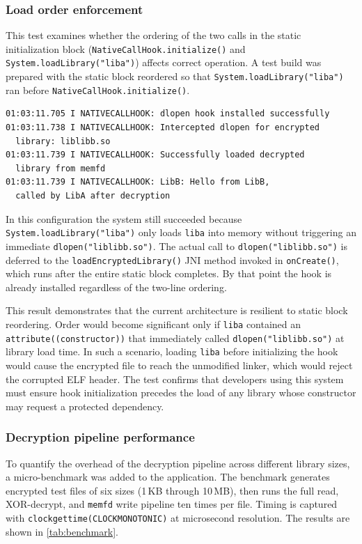 \documentclass[11pt,a4paper]{report}
\renewcommand\_{{\textunderscore\allowbreak}}
\begin{document}
\subsubsection{Load order enforcement}

This test examines whether the ordering of the two calls in the static initialization block (\texttt{NativeCall\allowbreak Hook.initialize()} and \texttt{System.loadLibrary("liba")}) affects correct operation. A test build was prepared with the static block reordered so that \texttt{System.\allowbreak loadLibrary("liba")} ran before \texttt{NativeCallHook.\allowbreak initialize()}.

\begin{verbatim}
01:03:11.705 I NATIVECALLHOOK: dlopen hook installed successfully
01:03:11.738 I NATIVECALLHOOK: Intercepted dlopen for encrypted
  library: liblibb.so
01:03:11.739 I NATIVECALLHOOK: Successfully loaded decrypted
  library from memfd
01:03:11.739 I NATIVECALLHOOK: LibB: Hello from LibB,
  called by LibA after decryption
\end{verbatim}

In this configuration the system still succeeded because \texttt{System.loadLibrary("liba")} only loads \texttt{liba} into memory without triggering an immediate \texttt{dlopen("liblibb.so")}. The actual call to \texttt{dlopen("liblibb.so")} is deferred to the \texttt{loadEncryptedLibrary()} JNI method invoked in \texttt{onCreate()}, which runs after the entire static block completes. By that point the hook is already installed regardless of the two-line ordering.

This result demonstrates that the current architecture is resilient to static block reordering. Order would become significant only if \texttt{liba} contained an \texttt{\_\_attribute\_\_((constructor))} that immediately called \texttt{dlopen("liblibb.so")} at library load time. In such a scenario, loading \texttt{liba} before initializing the hook would cause the encrypted file to reach the unmodified linker, which would reject the corrupted ELF header. The test confirms that developers using this system must ensure hook initialization precedes the load of any library whose constructor may request a protected dependency.

\subsubsection{Decryption pipeline performance}

To quantify the overhead of the decryption pipeline across different library sizes, a micro-benchmark was added to the application. The benchmark generates encrypted test files of six sizes (1\,KB through 10\,MB), then runs the full read, XOR-decrypt, and \texttt{memfd} write pipeline ten times per file. Timing is captured with \texttt{clock\_gettime(CLOCK\_MONOTONIC)} at microsecond resolution. The results are shown in \cref{tab:benchmark}.
\end{document}
